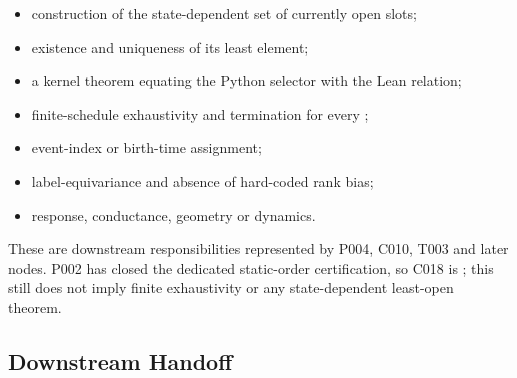 \begin{itemize}
\tightlist
\item
  construction of the state-dependent set of currently open slots;
\item
  existence and uniqueness of its least element;
\item
  a kernel theorem equating the Python selector with the Lean relation;
\item
  finite-schedule exhaustivity and termination for every \texttt{\protect{}};
\item
  event-index or birth-time assignment;
\item
  label-equivariance and absence of hard-coded rank bias;
\item
  response, conductance, geometry or dynamics.
\end{itemize}

These are downstream responsibilities represented by P004, C010, T003
and later nodes. P002 has closed the dedicated static-order
certification, so C018 is \texttt{\protect{}}; this still
does not imply finite exhaustivity or any state-dependent least-open
theorem.

\subsection{Downstream Handoff}\label{downstream-handoff-5}

